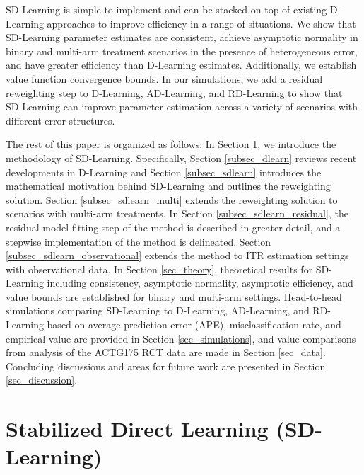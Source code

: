 \documentclass[useAMS,usenatbib]{biom}
\begin{document}
SD-Learning is simple to implement and can be stacked on top of existing D-Learning approaches to improve efficiency in a range of situations. We show that SD-Learning parameter estimates are consistent, achieve asymptotic normality in binary and multi-arm treatment scenarios in the presence of heterogeneous error, and have greater efficiency than D-Learning estimates. Additionally, we establish value function convergence bounds. In our simulations, we add a residual reweighting step to D-Learning, AD-Learning, and RD-Learning to show that SD-Learning can improve parameter estimation across a variety of scenarios with different error structures.

The rest of this paper is organized as follows: In Section \ref{sec_sdlearn}, we introduce the methodology of SD-Learning. Specifically, Section \ref{subsec_dlearn} reviews recent developments in D-Learning and Section \ref{subsec_sdlearn} introduces the mathematical motivation behind SD-Learning and outlines the reweighting solution. Section \ref{subsec_sdlearn_multi} extends the reweighting solution to scenarios with multi-arm treatments. In Section \ref{subsec_sdlearn_residual}, the residual model fitting step of the method is described in greater detail, and a stepwise implementation of the method is delineated. Section \ref{subsec_sdlearn_observational} extends the method to ITR estimation settings with observational data. In Section \ref{sec_theory}, theoretical results for SD-Learning including consistency, asymptotic normality, asymptotic efficiency, and value bounds are established for binary and multi-arm settings. Head-to-head simulations comparing SD-Learning to D-Learning, AD-Learning, and RD-Learning based on average prediction error (APE), misclassification rate, and empirical value are provided in Section \ref{sec_simulations}, and value comparisons from analysis of the ACTG175 RCT data are made in Section \ref{sec_data}. Concluding discussions and areas for future work are presented in Section \ref{sec_discussion}.

\section{Stabilized Direct Learning (SD-Learning)} \label{sec_sdlearn}
\end{document}
